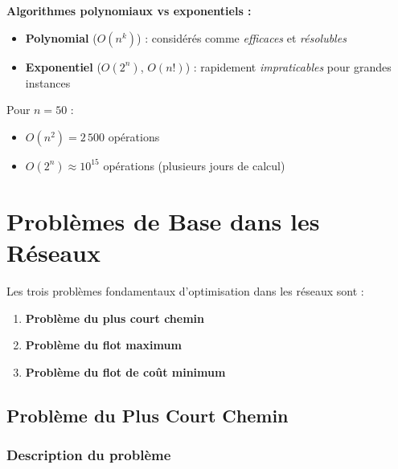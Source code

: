 \documentclass[12pt,a4paper]{article}
\begin{document}
\begin{astuce}
\textbf{Algorithmes polynomiaux vs exponentiels :}

\begin{itemize}
    \item \textcolor{defvert}{\textbf{Polynomial}} ($O(n^k)$) : considérés comme \textit{efficaces} et \textit{résolubles}
    \item \textcolor{importantrouge}{\textbf{Exponentiel}} ($O(2^n)$, $O(n!)$) : rapidement \textit{impraticables} pour grandes instances
\end{itemize}

Pour $n = 50$ :
\begin{itemize}
    \item $O(n^2) = 2\,500$ opérations
    \item $O(2^n) \approx 10^{15}$ opérations (plusieurs jours de calcul)
\end{itemize}
\end{astuce}

\newpage
\section{Problèmes de Base dans les Réseaux}

\begin{important}
Les trois problèmes fondamentaux d'optimisation dans les réseaux sont :

\begin{enumerate}
    \item \textcolor{titrebleu}{\textbf{Problème du plus court chemin}}
    \item \textcolor{defvert}{\textbf{Problème du flot maximum}}
    \item \textcolor{algoviolet}{\textbf{Problème du flot de coût minimum}}
\end{enumerate}
\end{important}

\subsection{Problème du Plus Court Chemin}

\subsubsection{Description du problème}
\end{document}

